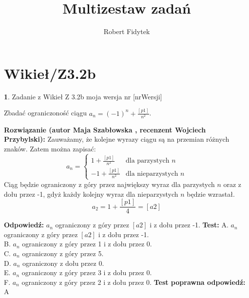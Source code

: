 \documentclass[12pt, a4paper]{article}
\title{Multizestaw zadań}
\author{Robert Fidytek}
\date{}
\theoremstyle{definition} %
\newtheorem{zad}{}
\newcommand{\kategoria}[1]{\section{#1}} %
\newcommand{\zadStart}[1]{\begin{zad}#1\newline} %
\newcommand{\zadStop}{\end{zad}}   %
\newcommand{\rozwStart}[2]{\noindent \textbf{Rozwiązanie (autor #1 , recenzent #2): }\newline} %
\newcommand{\rozwStop}{\newline}                                            %
\newcommand{\odpStart}{\noindent \textbf{Odpowiedź:}\newline}    %
\newcommand{\odpStop}{\newline}                                             %
\newcommand{\testStart}{\noindent \textbf{Test:}\newline} %
\newcommand{\testStop}{\newline} %
\newcommand{\kluczStart}{\noindent \textbf{Test poprawna odpowiedź:}\newline} %
\newcommand{\kluczStop}{\newline} %
\begin{document}
\maketitle


\kategoria{Wikieł/Z3.2b}
\zadStart{Zadanie z Wikieł Z 3.2b moja wersja nr [nrWersji]}


Zbadać ograniczoność ciągu $a_{n}=(-1)^{n}+\frac{[p1]}{n^{2}}$.
\zadStop

\rozwStart{Maja Szabłowska}{Wojciech Przybylski}
Zauważamy, że kolejne wyrazy ciągu są na przemian różnych znaków.
Zatem można zapisać:
$$
a_{n}=\left\{ \begin{array}{ll}
1+\frac{[p1]}{n^{2}} & \textrm{dla parzystych $n$}\\
-1+\frac{[p1]}{n^{2}} & \textrm{dla nieparzystych $n$}
\end{array} \right.
$$
Ciąg będzie ograniczony z góry przez największy wyraz dla parzystych $n$ oraz z dołu przez -1, gdyż każdy kolejny wyraz dla nieparzystych $n$ będzie wzrastał.
$$a_{2}=1+\frac{[p1]}{4}=[a2]$$
\rozwStop


\odpStart
$a_{n}$ ograniczony z góry przez $[a2]$ i z dołu przez -1.
\odpStop
\testStart
A. $a_{n}$ ograniczony z góry przez $[a2]$ i z dołu przez -1.\\
B. $a_{n}$ ograniczony z góry przez 1 i z dołu przez 0.\\
C. $a_{n}$ ograniczony z góry przez 5.\\
D. $a_{n}$ ograniczony z dołu przez 0.\\
E. $a_{n}$ ograniczony z góry przez 3 i z dołu przez 0.\\
F. $a_{n}$ ograniczony z góry przez 2 i z dołu przez 0.
\testStop
\kluczStart
A
\kluczStop
\end{document}
